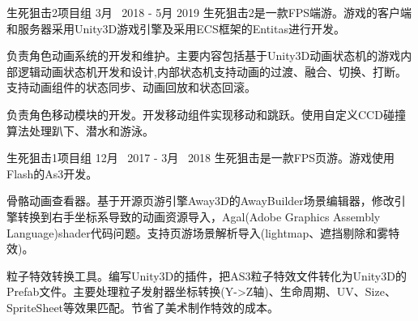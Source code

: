 \begin{cventries}
\cventryproject
{生死狙击2项目组} %
{3月~ 2018 - 5月 2019} %
{生死狙击2是一款FPS端游。游戏的客户端和服务器采用Unity3D游戏引擎及采用ECS框架的Entitas进行开发。}
{ %
\begin{cvitems}
\item {负责角色动画系统的开发和维护。主要内容包括基于Unity3D动画状态机的游戏内部逻辑动画状态机开发和设计,内部状态机支持动画的过渡、融合、切换、打断。支持动画组件的状态同步、动画回放和状态回滚。}
\item{负责角色移动模块的开发。开发移动组件实现移动和跳跃。使用自定义CCD碰撞算法处理趴下、潜水和游泳。}
\end{cvitems}
}

\cventryproject
{生死狙击1项目组} %
{12月~ 2017 - 3月~ 2018} %
{生死狙击是一款FPS页游。游戏使用Flash的As3开发。}
{ %
	\begin{cvitems}
		\item {骨骼动画查看器。基于开源页游引擎Away3D的AwayBuilder场景编辑器，修改引擎转换到右手坐标系导致的动画资源导入，Agal(Adobe Graphics Assembly Language)shader代码问题。支持页游场景解析导入(lightmap、遮挡剔除和雾特效)。}
		\item {粒子特效转换工具。编写Unity3D的插件，把AS3粒子特效文件转化为Unity3D的Prefab文件。主要处理粒子发射器坐标转换(Y->Z轴)、生命周期、UV、Size、SpriteSheet等效果匹配。节省了美术制作特效的成本。}
	\end{cvitems}
}



\end{cventries}
